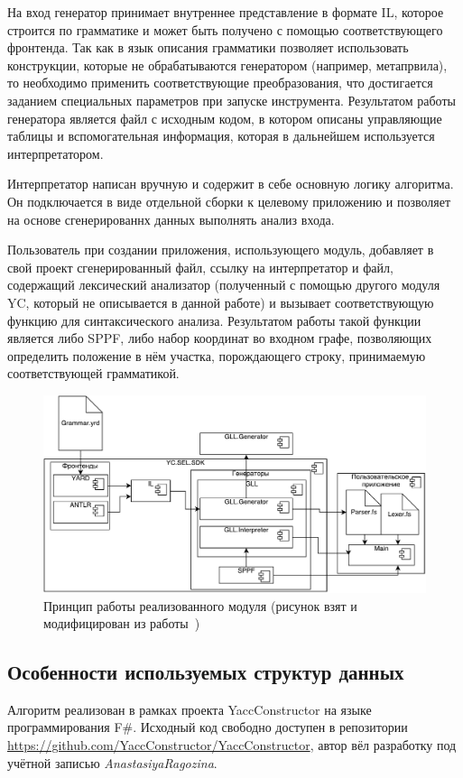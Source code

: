 На вход генератор принимает внутреннее представление в формате IL, которое строится по грамматике и может быть получено с помощью соответствующего фронтенда. Так как в язык описания грамматики позволяет использовать конструкции, которые не обрабатываются генератором (например, метапрвила), то необходимо применить соответствующие преобразования, что достигается заданием специальных параметров при запуске инструмента. Результатом работы генератора является файл с исходным кодом, в котором описаны управляющие таблицы и вспомогательная информация, которая в дальнейшем используется интерпретатором. 

Интерпретатор написан вручную и содержит в себе основную логику алгоритма. Он подключается в виде отдельной сборки к целевому приложению и позволяет на основе сгенерированнх данных выполнять анализ входа.

Пользователь при создании приложения, использующего модуль, добавляет в свой проект сгенерированный файл, ссылку на интерпретатор и файл, содержащий лексический анализатор (полученный с помощью другого модуля YC, который не описывается в данной работе) и вызывает соответствующую функцию для синтаксического анализа. Результатом работы такой функции является либо SPPF, либо набор координат во входном графе, позволяющих определить положение в нём участка, порождающего строку, принимаемую соответствующей грамматикой.

\begin{figure}
 \centering
 \includegraphics[width=\textwidth]{Ragozina/pics/GLL_Proc.pdf}
 \caption{Принцип работы реализованного модуля (рисунок взят и модифицирован из работы~\cite{GrigorievPhd})}
 \label{Arch2}
\end{figure}

\subsection{Особенности используемых структур данных}
Алгоритм реализован в рамках проекта YaccConstructor на языке программирования F\#. Исходный код свободно доступен в репозитории \url{https://github.com/YaccConstructor/YaccConstructor}, автор вёл разработку под учётной записью {\it AnastasiyaRagozina}.

